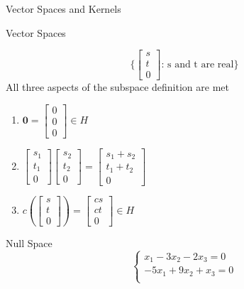 \documentclass[a4paper, 12pt]{article}
\begin{document}
\begin{section}{Vector Spaces and Kernels}
\begin{subsection}{Vector Spaces}
\begin{equation}
\Biggl\{ \begin{bmatrix} s \\ t \\ 0 \end{bmatrix} 
\mbox{: s and t are real} \Biggl\}
\end{equation}
All three aspects of the subspace definition are met
\begin{enumerate}
\item{$\textbf{0}=\begin{bmatrix} 0\\ 0\\ 0 \end{bmatrix} \in H$}
\item{$\begin{bmatrix} s_1\\ t_1\\ 0 \end{bmatrix} 
\begin{bmatrix} s_2\\ t_2\\ 0 \end{bmatrix}= 
\begin{bmatrix} s_1+s_{2}\\ t_1+t_2\\ 0 \end{bmatrix}$}
\item{$c(\begin{bmatrix} s\\ t\\ 0 \end{bmatrix}) = \begin{bmatrix} 
cs\\ ct\\ 0\end{bmatrix} \in H$}
\end{enumerate}
\end{subsection}
\begin{subsection}{Null Space}
\begin{equation}
\begin{cases}
	x_1-3x_2-2x_3=0 \\
	-5x_1+9x_2+x_3=0\\
\end{cases}

\end{equation}
\end{subsection}
\end{section}
\end{document}
